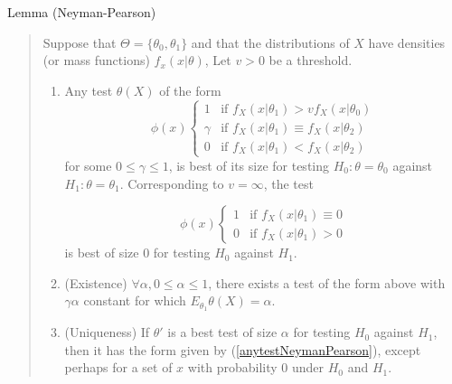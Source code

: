 Lemma (Neyman-Pearson) 
\begin{quote}
	Suppose that $\Theta = \{\theta_0 , \theta_1 \}$ and that the distributions of $X$ have densities (or mass functions) $f_x (x | \theta)$,  Let $v > 0$ be a threshold.
	\begin{enumerate}
		\item Any test $\theta (X)$ of the form 
		\begin{equation}
			\phi (x) \left\{ 
			\begin{array}{ll}
				1 & \textrm{if } f_X(x | \theta_1) > v f_X (x | \theta_0) \\
				\gamma & \textrm{if } f_X (x | \theta_1) \equiv f_X ( x | \theta_2)\\
				0 & \textrm{if } f_X (x | \theta_1) < f_X ( x | \theta_2)
			\end{array}
			\right.\label{anytestNeymanPearson}
		\end{equation}
		for some $0 \le \gamma \le 1$, is best of its size for testing $H_0:\theta = \theta_0$ against $H_1:\theta = \theta_1$.  Corresponding to $v = \infty$, the test 
		
		\begin{equation}
			\phi (x) \left\{ 
			\begin{array}{ll}
				1 & \textrm{if } f_X(x | \theta_1) \equiv 0 \\
				0 & \textrm{if } f_X (x | \theta_1) > 0
			\end{array}
			\right.
		\end{equation}
		is best of size $0$ for testing $H_0$ against $H_1$.
		\item (Existence) $\forall \alpha, 0 \le \alpha \le 1$, there exists a test of the form above with $\gamma \alpha$ constant for which $E_{\theta_1} \theta(X) = \alpha$.  
		\item (Uniqueness) If $\theta'$ is a best test of size $\alpha$ for testing $H_0$ against $H_1$, then it has the form given by (\ref{anytestNeymanPearson}),  except perhaps for a set of $x$ with probability $0$ under $H_0$ and $H_1$.
	\end{enumerate}
	\cite[463]{moon-stirling}
\end{quote}
